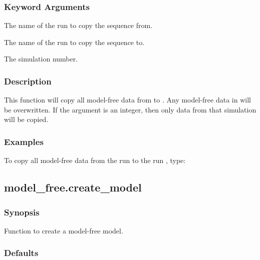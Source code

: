   
 \subsubsection{Keyword Arguments} 

   The name of the run to copy the sequence from.   

   The name of the run to copy the sequence to.   

   The simulation number.  

  

  
 \subsubsection{Description} 

 This function will copy all model-free data from  to .  Any model-free data in  will be overwritten.  If the argument  is an integer, then only data from that simulation will be copied. 
  

  
 \subsubsection{Examples} 

 To copy all model-free data from the run  to the run , type: 
  



  

 \newpage 

 \subsection{model\_free.create\_model} 

  
 \subsubsection{Synopsis} 

 Function to create a model-free model. 
  

  
 \subsubsection{Defaults} 

